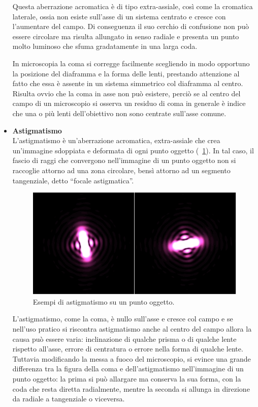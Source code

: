 \begin{itemize}
Questa aberrazione acromatica è di tipo extra-assiale, così come la cromatica laterale, ossia non esiste sull'asse di un sistema centrato e cresce con l'aumentare del campo. 
Di conseguenza il suo cerchio di confusione non può essere circolare ma risulta allungato in senso radiale e presenta un punto molto luminoso che sfuma gradatamente in una larga coda. 

In microscopia la coma si corregge facilmente scegliendo in modo opportuno la posizione del diaframma e la forma delle lenti, prestando attenzione al fatto che essa è assente in un sistema simmetrico col diaframma al centro.
Risulta ovvio che la coma in asse non può esistere, perciò se al centro del campo di un microscopio si osserva un residuo di coma in generale è indice che una o più lenti dell'obiettivo non sono centrate sull'asse comune.

\item \textbf{Astigmatismo}\\
L'astigmatismo è un'aberrazione acromatica, extra-assiale che crea un'immagine sdoppiata e deformata di ogni punto oggetto (\figurename~\ref{fig:astigmatismo}). In tal caso, il fascio di raggi che convergono nell'immagine di un punto oggetto non si raccoglie attorno ad una zona circolare, bensì attorno ad un segmento tangenziale, detto ``focale astigmatica''.

\begin{figure}
 \centering
 \includegraphics[scale=.50]{img/CAP2astig.jpg}
 \caption{\small{Esempi di astigmatismo su un punto oggetto.}}
 \label{fig:astigmatismo}
\end{figure}

L'astigmatismo, come la coma, è nullo sull'asse e cresce col campo e se nell'uso pratico si riscontra astigmatismo anche al centro del campo allora la causa può essere varia: inclinazione di qualche prisma o di qualche lente rispetto all'asse, errore di centratura o errore nella forma di qualche lente.
Tuttavia modificando la messa a fuoco del microscopio, si evince una grande differenza tra la figura della coma e dell'astigmatismo nell'immagine di un punto oggetto: la prima si può allargare ma conserva la sua forma, con la coda che resta diretta radialmente, mentre la seconda si allunga in direzione da radiale a tangenziale o viceversa. 


\end{itemize}
